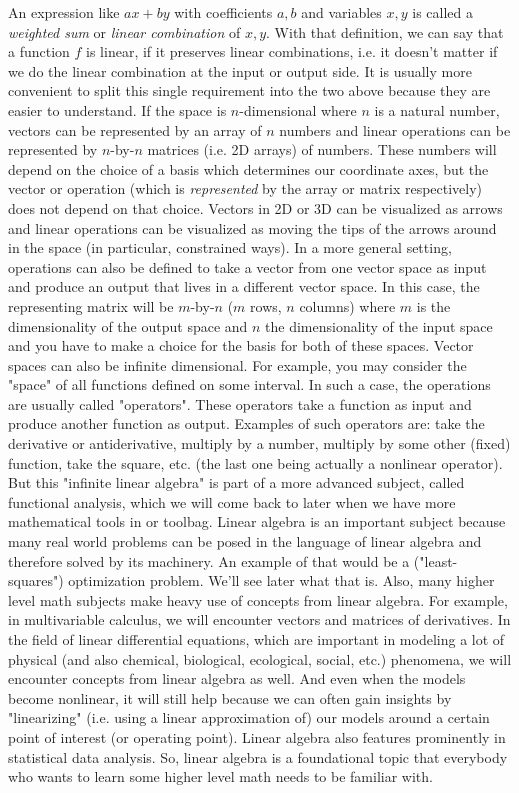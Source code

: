 An expression like $a x + b y$ with coefficients $a,b$ and variables $x,y$ is called a \emph{weighted sum} or \emph{linear combination} of $x,y$. With that definition, we can say that a function $f$ is linear, if it preserves linear combinations, i.e. it doesn't matter if we do the linear combination at the input or output side. It is usually more convenient to split this single requirement into the two above because they are easier to understand. If the space is $n$-dimensional where $n$ is a natural number, vectors can be represented by an array of $n$ numbers and linear operations can be represented by $n$-by-$n$ matrices (i.e. 2D arrays) of numbers. These numbers will depend on the choice of a basis which determines our coordinate axes, but the vector or operation (which is \emph{represented} by the array or matrix respectively) does not depend on that choice. Vectors in 2D or 3D can be visualized as arrows and linear operations can be visualized as moving the tips of the arrows around in the space (in particular, constrained ways). In a more general setting, operations can also be defined to take a vector from one vector space as input and produce an output that lives in a different vector space. In this case, the representing matrix will be $m$-by-$n$ ($m$ rows, $n$ columns) where $m$ is the dimensionality of the output space and $n$ the dimensionality of the input space and you have to make a choice for the basis for both of these spaces. Vector spaces can also be infinite dimensional. For example, you may consider the "space" of all functions defined on some interval. In such a case, the operations are usually called "operators". These operators take a function as input and produce another function as output. Examples of such operators are: take the derivative or antiderivative, multiply by a number, multiply by some other (fixed) function, take the square, etc. (the last one being actually a nonlinear operator). But this "infinite linear algebra" is part of a more advanced subject, called functional analysis, which we will come back to later when we have more mathematical tools in or toolbag. Linear algebra is an important subject because many real world problems can be posed in the language of linear algebra and therefore solved by its machinery. An example of that would be a ("least-squares") optimization problem. We'll see later what that is. Also, many higher level math subjects make heavy use of concepts from linear algebra. For example, in multivariable calculus, we will encounter vectors and matrices of derivatives. In the field of linear differential equations, which are important in modeling a lot of physical (and also chemical, biological, ecological, social, etc.) phenomena, we will encounter concepts from linear algebra as well. And even when the models become nonlinear, it will still help because we can often gain insights by "linearizing" (i.e. using a linear approximation of) our models around a certain point of interest (or operating point). Linear algebra also features prominently in statistical data analysis. So, linear algebra is a foundational topic that everybody who wants to learn some higher level math needs to be familiar with.

